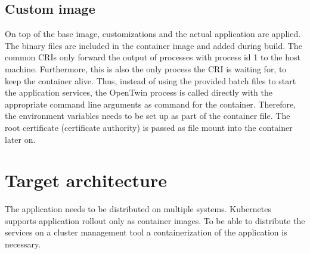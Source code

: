 \subsection{Custom image}
On top of the base image, customizations and the actual application are applied. The binary files are included in the container image and added during build. The common \acp{CRI} only forward the output of processes with process id 1 to the host machine. Furthermore, this is also the only process the  \ac{CRI} is waiting for, to keep the container alive. Thus, instead of using the provided batch files to start the application services, the OpenTwin process is called directly with the appropriate command line arguments as command for the container.
Therefore, the environment variables needs to be set up as part of the container file.
The root certificate (certificate authority) is passed as file mount into the container later on.


\section{Target architecture}
The application needs to be distributed on multiple systems. Kubernetes supports application rollout only as container images. To be able to distribute the services on a cluster management tool a containerization of the application is necessary.